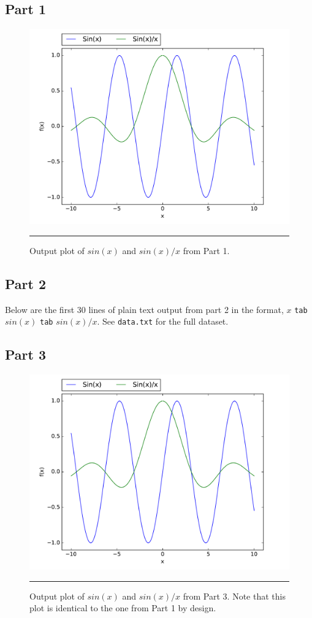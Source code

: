 \documentclass[notitlepage,aps,prd,nofootinbib]{revtex4-1}
\begin{document}
\subsection{Part 1}
\begin{figure}[htbc]
  \centering
  \includegraphics[width=.70\textwidth]{output/part1.pdf}
	{\par\nobreak\rule[9pt]{35em}{0.5pt}\vspace{-5mm}}
	\caption{Output plot of $sin\left(x\right)$ and $sin\left(x\right)/x$ from Part 1.}
	\label{fig:part1}
\end{figure}

\subsection{Part 2}
Below are the first 30 lines of plain text output from part 2 in the format, $x$ \texttt{tab} $sin\left(x\right)$ \texttt{tab} $sin\left(x\right)/x$. See \texttt{data.txt} for the full dataset.



\subsection{Part 3}
\begin{figure}[htbc]
  \centering
  \includegraphics[width=.70\textwidth]{output/part3.pdf}
	{\par\nobreak\rule[9pt]{35em}{0.5pt}\vspace{-5mm}}
	\caption{Output plot of $sin\left(x\right)$ and $sin\left(x\right)/x$ from Part 3. Note that this plot is identical to the one from Part 1 by design.}
	\label{fig:part3}
\end{figure}
\end{document}

